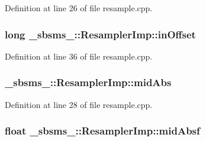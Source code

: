 Definition at line 26 of file resample.\+cpp.

\subsubsection[{\texorpdfstring{in\+Offset}{inOffset}}]{\setlength{\rightskip}{0pt plus 5cm}long \+\_\+sbsms\+\_\+\+::\+Resampler\+Imp\+::in\+Offset\hspace{0.3cm}{\ttfamily [protected]}}\hypertarget{class__sbsms___1_1_resampler_imp_a787601fd02f94f2c3f4329f05c799add}{}\label{class__sbsms___1_1_resampler_imp_a787601fd02f94f2c3f4329f05c799add}


Definition at line 36 of file resample.\+cpp.

\subsubsection[{\texorpdfstring{mid\+Abs}{midAbs}}]{ \+\_\+sbsms\+\_\+\+::\+Resampler\+Imp\+::mid\+Abs\hspace{0.3cm}{\ttfamily [protected]}}\hypertarget{class__sbsms___1_1_resampler_imp_a1c502c2dd2b59085e9a7472db873ddf9}{}\label{class__sbsms___1_1_resampler_imp_a1c502c2dd2b59085e9a7472db873ddf9}


Definition at line 28 of file resample.\+cpp.

\subsubsection[{\texorpdfstring{mid\+Absf}{midAbsf}}]{\setlength{\rightskip}{0pt plus 5cm}float \+\_\+sbsms\+\_\+\+::\+Resampler\+Imp\+::mid\+Absf\hspace{0.3cm}{\ttfamily [protected]}}\hypertarget{class__sbsms___1_1_resampler_imp_ac0c741b4d1413ecea78fafe81240cf5c}{}\label{class__sbsms___1_1_resampler_imp_ac0c741b4d1413ecea78fafe81240cf5c}


